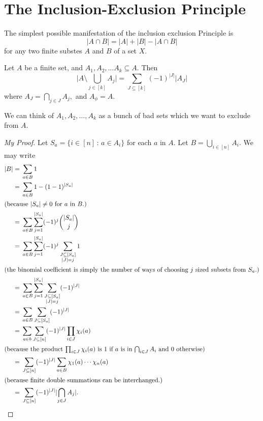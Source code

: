 
\section{The Inclusion-Exclusion Principle}
The simplest possible manifestation of the inclusion exclusion Principle
is
$$ \lvert A \cap B \rvert = \lvert A \rvert + \lvert B \rvert - \lvert A \cap B \rvert$$
for any two finite substes $A$ and $B$ of a set $X.$

\begin{theorem}
	Let $A$ be a finite set, and $A_1, A_2, \dotsc A_k \subseteq A.$
	Then
	$$ \lvert A \setminus \bigcup_{j \in [k]} A_j \rvert
	= \sum_{J \subseteq[k]} (-1)^{ \lvert  J \rvert} \lvert A_J \rvert$$
	where $A_J = \bigcap_{j \in J} A_j,$ and $A_{\phi} = A.$
\end{theorem}

\begin{remark}
	We can think of $A_1, A_2, \dotsc, A_k$ as a bunch of bad sets
	which we want to exclude from $A.$
\end{remark}

\begin{proof}[My Proof]
	Let $S_a = \{ i \in [n] \, : \, a \in A_i \}$ for each $a$ in 
	$A.$ Let $B = \bigcup_{i \in [n]} A_i.$ We may write
\begin{align*}
	\lvert B \rvert%
	={}& \sum_{a \in B} 1 \\
	={}& \sum_{a \in B} 1 - (1-1)^{ \lvert S_a \rvert} \\
	\intertext{(because $ \lvert S_a \rvert \not = 0$ for $a$
	in $B.$)}
	={}& \sum_{a \in B} \sum_{j=1}^{ \lvert S_a \rvert} (-1)^j
	\binom{ \lvert S_a \rvert}{j} \\
	={}& \sum_{a \in B} \sum_{j=1}^{ \lvert S_a \rvert} (-1)^j
\sum_{\substack{ J \subseteq [S_a]\\ \lvert J \rvert = j}} 1 \\
	\intertext{(the binomial coefficient is simply the number of ways of choosing $j$ sized subsets from $S_a.$)}
	={}& \sum_{a \in B} \sum_{j=1}^{ \lvert S_a \rvert}
\sum_{\substack{ J \subseteq [S_a]\\ \lvert J \rvert = j}} (-1)^{ \lvert J \rvert} \\
	={}& \sum_{a \in B} \sum_{J \subseteq [S_a]} (-1)^{ \lvert J \rvert} \\ 
	={}& \sum_{a \in b} \sum_{J \subseteq [n]} (-1)^{ \lvert J \rvert} \prod_{i \in J} \chi_i(a) \\
	\intertext{(because the product $\prod_{i \in J} \chi_i(a) $
		is $1$ if $a$ is in $\bigcap_{i \in J} A_i$ and
	$0$ otherwise)}
	={}& \sum_{J \subseteq [n]} (-1)^{ \lvert J \rvert}
	\sum_{a \in B} \chi_1(a) \cdots \chi_n(a) \\
	\intertext{(because finite double summations can be interchanged.)}
	={}& \sum_{J \subseteq [n]} (-1)^{ \lvert J \rvert}
	\lvert \bigcap_{j \in J} A_j \rvert .
\end{align*}
\end{proof}

